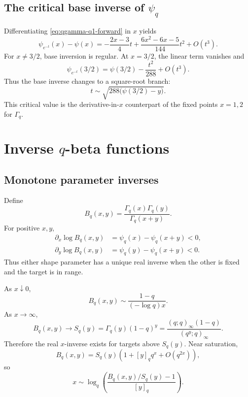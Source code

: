 \documentclass[11pt,letterpaper,oneside,openany]{book}
\theoremstyle{definition}
\theoremstyle{remark}
\begin{document}
\section{The critical base inverse of \texorpdfstring{\(\psi_q\)}{psiq}}
Differentiating \eqref{eq:qgamma-q1-forward} in \(x\) yields
\begin{equation}\label{eq:qdigamma-q1-forward}
 \psi_{e^{-t}}(x)-\psi(x)
 =-\frac{2x-3}{4}t
 +\frac{6x^2-6x-5}{144}t^2+O(t^3).
\end{equation}
For \(x\ne3/2\), base inversion is regular.  At \(x=3/2\), the linear term
vanishes and
\begin{equation}\label{eq:qdigamma-critical}
 \psi_{e^{-t}}(3/2)=\psi(3/2)-\frac{t^2}{288}+O(t^3).
\end{equation}
Thus the base inverse changes to a square-root branch:
\[
 t\sim\sqrt{288\bigl(\psi(3/2)-y\bigr)}.
\]
This critical value is the derivative-in-\(x\) counterpart of the fixed points
\(x=1,2\) for \(\Gamma_q\).

\chapter{Inverse \texorpdfstring{\(q\)}{q}-beta functions}

\section{Monotone parameter inverses}
Define
\[
 B_q(x,y)=\frac{\Gamma_q(x)\Gamma_q(y)}{\Gamma_q(x+y)}.
\]
For positive \(x,y\),
\begin{align*}
 \partial_x\log B_q(x,y)&=\psi_q(x)-\psi_q(x+y)<0,\\
 \partial_y\log B_q(x,y)&=\psi_q(y)-\psi_q(x+y)<0.
\end{align*}
Thus either shape parameter has a unique real inverse when the other is fixed
and the target is in range.

As \(x\downarrow0\),
\[
 B_q(x,y)\sim\frac{1-q}{(-\log q)x}.
\]
As \(x\to\infty\),
\begin{equation}\label{eq:qbeta-saturation}
 B_q(x,y)\longrightarrow
 S_q(y)=\Gamma_q(y)(1-q)^y
 =\frac{(q;q)_\infty(1-q)}{(q^y;q)_\infty}.
\end{equation}
Therefore the real \(x\)-inverse exists for targets above \(S_q(y)\).  Near
saturation,
\[
 B_q(x,y)=S_q(y)\left(1+[y]_qq^x+O(q^{2x})\right),
\]
so
\begin{equation}\label{eq:qbeta-parameter-inverse}
 x\sim\log_q\left(\frac{B_q(x,y)/S_q(y)-1}{[y]_q}\right).
\end{equation}
\end{document}
